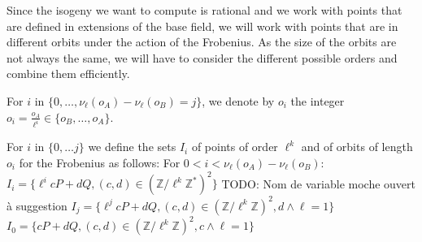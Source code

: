 \documentclass{lms}
\newcommand{\todo}[1]{{\color{red}TODO: #1}}
\begin{document}

Since the isogeny we want to compute is rational and we work with
points that are defined in extensions of the base field, we will work
with points that are in different orbits under the action of the
Frobenius. As the size of the orbits are not always the same, we will
have to consider the different possible orders and combine them
efficiently.

\begin{defi}
  For $i$ in $\{0, \dots,\nu_{\ell}(o_A)-\nu_{\ell}(o_B)=j\}$, we denote by $o_i$
  the integer $o_i =\frac{o_A}{\ell^i} \in \{o_B,\dots,o_A\}$.
\end{defi}




\begin{defi}
For $i$ in $\{0,\dots j\}$ we define the sets
$I_i$ of points of order $\ell^k$ and of orbits of length $o_i$ for the Frobenius as follows:
\newline
For $0 < i < \nu_{\ell}(o_A)-\nu_{\ell}(o_B)$:
$I_i=\{ \ell^i c P + d Q, (c,d) \in \left( \mathbb{Z}/ \ell^k \mathbb{Z}^{*} \right)^2 \} $ \todo{Nom de variable moche ouvert à suggestion}
\newline
$I_j=\{ \ell^j c P + d Q, (c,d) \in \left( \mathbb{Z}/ \ell^k \mathbb{Z} \right)^2, d \wedge \ell =1 \} $
\newline
$I_0=\{ c P + d Q, (c,d) \in \left( \mathbb{Z}/ \ell^k \mathbb{Z} \right)^2, c \wedge \ell =1 \}$
\end{defi}
\end{document}
